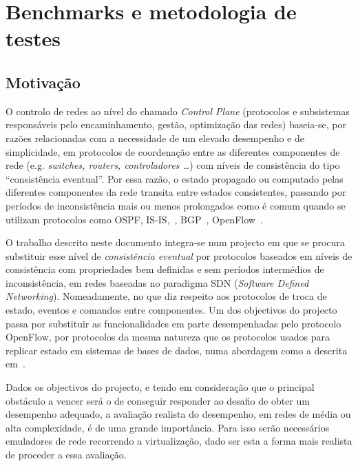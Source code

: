 


\section{Benchmarks e metodologia de testes}

\subsection{Motivação}

O controlo de redes ao nível do chamado \emph{Control Plane} (protocolos e subsistemas responsáveis
pelo encaminhamento, gestão, optimização das redes) baseia-se, por razões relacionadas
com a necessidade de um elevado desempenho e de simplicidade, em protocolos de coordenação
entre as diferentes componentes de rede (e.g. \emph{switches, routers, controladores \dots}) com
níveis de consistência do tipo ``consistência eventual''. Por essa razão, o estado propagado ou computado
pelas diferentes componentes da rede transita entre estados consistentes,  passando por períodos de
inconsistência mais ou menos prolongados como é comum quando se utilizam protocolos como
OSPF, IS-IS,~\cite{francois2005achieving}, BGP~\cite{bgpConvergence,consensus-bgp},
OpenFlow~\cite{McKeown:2008:OEI:1355734.1355746}.

O trabalho descrito neste documento integra-se num projecto em que se procura substituir esse nível de \emph{consistência eventual}
por protocolos baseados em níveis de consistência com propriedades bem definidas e sem períodos intermédios de
inconsistência, em redes baseadas no paradigma SDN (\emph{Software Defined Networking}). Nomeadamente,
no que diz respeito aos protocolos de troca de estado, eventos e comandos entre componentes. Um dos objectivos do projecto
passa por substituir as funcionalidades em parte desempenhadas pelo protocolo OpenFlow,
por protocolos da mesma natureza que os protocolos usados para replicar estado em sistemas de bases de dados,
numa abordagem como a descrita em~\cite{dbcp}.

Dados os objectivos do projecto, e tendo em consideração que o principal obstáculo a vencer será o de
conseguir responder ao desafio de obter um desempenho adequado, a avaliação realista do desempenho, em redes de média
ou alta complexidade, é de uma grande importância. Para isso serão necessários emuladores de rede recorrendo a
virtualização, dado ser esta a forma mais realista de proceder a essa avaliação.

